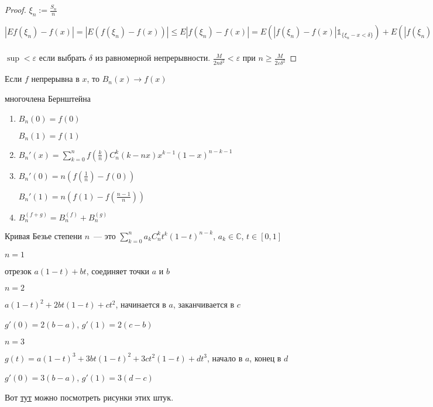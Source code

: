 \begin{proof}
	$\xi_n := \frac{S_n}{n}$
	
	$|Ef(\xi_n) - f(x)| = |E(f(\xi_n) - f(x))| \leqslant E|f(\xi_n)-f(x)| = E(|f(\xi_n) - f(x)|\mathds{1}_{\{\xi_n-x < \delta\}}) + E(|f(\xi_n) - f(x)|\mathds{1}_{\{\xi_n-x \geqslant \delta\}}) \leqslant \sup\limits_{|x - y| < \delta} |f(x) - f(y)| + E(2M\mathds{1}_{\{\xi_n-x \geqslant \delta\}}) = \sup\limits_{|x - y| < \delta} |f(x) - f(y)| + 2M P(|\xi_n - x| \geqslant \delta) \leqslant \sup\limits_{|x - y| < \delta} |f(x) - f(y)| + 2M\frac{D\frac{S_n}{n}}{\delta^2} = \sup\limits_{|x - y| < \delta} |f(x) - f(y)| + \frac{x(1-x)n}{n^2\delta^2} \leqslant \sup\limits_{|x - y| < \delta} |f(x) - f(y)| + \frac{M}{2n\delta^2} < 2\varepsilon$
	
	$\sup < \varepsilon$ если выбрать $\delta$ из равномерной непрерывности. $\frac{M}{2n\delta^2} < \varepsilon$ при $n \geqslant \frac{M}{2\varepsilon\delta^2}$
\end{proof}

\begin{exercise}
	Если $f$ непрерывна в $x$, то $B_n(x) \rightarrow f(x)$
\end{exercise}

\begin{properties}
	многочлена Бернштейна
	
	\begin{enumerate}
		\item $B_n(0) = f(0)$
		
		$B_n(1) = f(1)$
		
		\item $B_n'(x) = \sum\limits_{k = 0}^n f(\frac{k}{n})C_n^k (k-nx)x^{k-1} (1-x)^{n-k-1}$
		
		\item $B_n'(0) = n(f(\frac{1}{n}) - f(0))$
		
		$B_n'(1) = n(f(1) - f(\frac{n-1}{n}))$
		
		\item $B_n^{(f+g)} = B_n^{(f)} + B_n^{(g)}$
	\end{enumerate}
\end{properties}

\begin{definition}
	Кривая Безье степени $n$~--- это $\sum\limits_{k = 0}^n a_k C_n^k t^k (1-t)^{n-k}$, $a_k \in \mathbb{C}$, $t \in [0, 1]$
	
	$n = 1$ 
	
	отрезок $a(1-t) + bt$, соединяет точки $a$ и $b$
	
	$n = 2$  
	
	$a(1-t)^2 + 2bt(1-t) + ct^2$, начинается в $a$, заканчивается в $c$
	
	$g'(0) = 2(b-a)$, $g'(1) = 2(c-b)$
	
	$n = 3$
	
	$g(t) = a(1-t)^3 + 3bt(1-t)^2 + 3ct^2(1-t) + dt^3$, начало в $a$, конец в $d$
	
	$g'(0) = 3(b-a)$, $g'(1) = 3(d-c)$
	
	Вот \href{https://www.jasondavies.com/animated-bezier/}{тут} можно посмотреть рисунки этих штук.
\end{definition}

